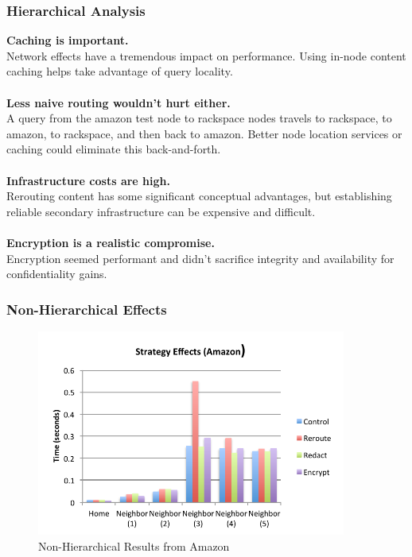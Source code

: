 \documentclass[t,handout]{beamer}
\begin{document}
\begin{frame}
\frametitle{Hierarchical Analysis}
{\bf Caching is important.} \\
{\scriptsize Network effects have a tremendous impact on performance.  Using in-node content caching helps take advantage of query locality.} \\
~\\
{\bf Less naive routing wouldn't hurt either.} \\
{\scriptsize A query from the amazon test node to rackspace nodes travels to rackspace, to amazon, to rackspace, and then back to amazon.  Better node location services or caching could eliminate this back-and-forth.} \\
~\\
{\bf Infrastructure costs are high.} \\
{\scriptsize Rerouting content has some significant conceptual advantages, but establishing reliable secondary infrastructure can be expensive and difficult. } \\
~\\
{\bf Encryption is a realistic compromise.} \\
{\scriptsize Encryption seemed performant and didn't sacrifice integrity and availability for confidentiality gains.}
\end{frame}

\begin{frame}
\frametitle{Non-Hierarchical Effects}
\begin{figure}[!t]
\centering
\includegraphics[width=4in]{nh_strategy_effects_az}
\caption{Non-Hierarchical Results from Amazon}
\end{figure}
\end{frame}
\end{document}
